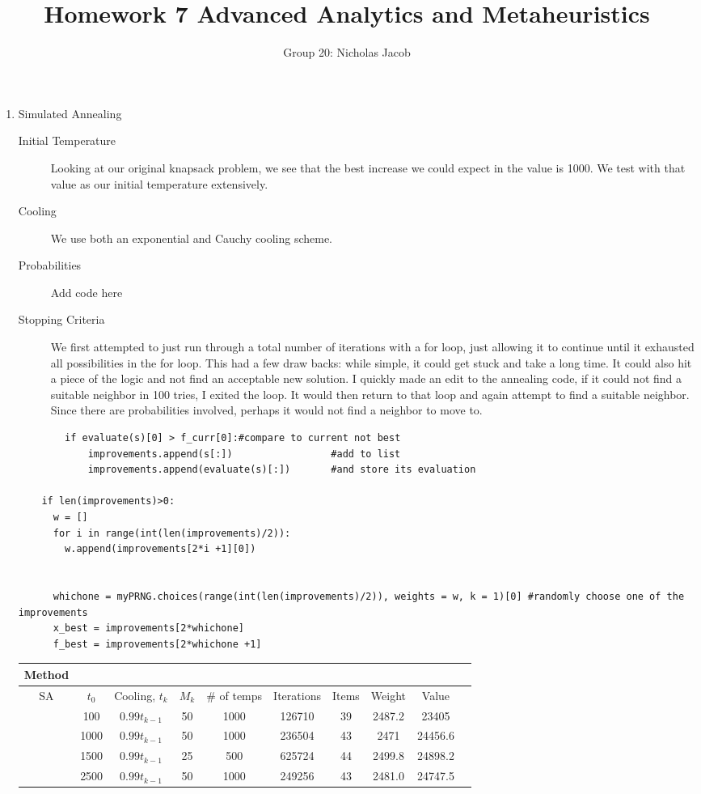 \documentclass[11pt]{article}
\author{Group 20: Nicholas Jacob}
\title{Homework 7 Advanced Analytics and Metaheuristics}
\begin{document}
\maketitle

\begin{enumerate}
\item Simulated Annealing

\begin{description}
\item[Initial Temperature]  Looking at our original knapsack problem, we see that the best increase we could expect in the value is 1000.  We test with that value as our initial temperature extensively.
\item[Cooling]  We use both an exponential and Cauchy cooling scheme. 
\item[Probabilities] Add code here
\item[Stopping Criteria]  We first attempted to just run through a total number of iterations with a for loop, just allowing it to continue until it exhausted all possibilities in the for loop.  This had a few draw backs:  while simple, it could get stuck and take a long time.  It could also hit a piece of the logic and not find an acceptable new solution.  I quickly made an edit to the annealing code, if it could not find a suitable neighbor in 100 tries, I exited the loop.  It would then return to that loop and again attempt to find a suitable neighbor.  Since there are probabilities involved, perhaps it would not find a neighbor to move to. 


\end{description}
\begin{verbatim}
        if evaluate(s)[0] > f_curr[0]:#compare to current not best
            improvements.append(s[:])                 #add to list
            improvements.append(evaluate(s)[:])       #and store its evaluation

    if len(improvements)>0:
      w = []
      for i in range(int(len(improvements)/2)):
        w.append(improvements[2*i +1][0])


      whichone = myPRNG.choices(range(int(len(improvements)/2)), weights = w, k = 1)[0] #randomly choose one of the improvements
      x_best = improvements[2*whichone]
      f_best = improvements[2*whichone +1]
\end{verbatim}
\begin{tabular}{c*{9}{c}}
Method\\ \hline
SA&$t_0$&Cooling, $t_k$&$M_k$& \# of temps&Iterations&Items&Weight&Value\\ \hline
&100&$0.99t_{k-1}$&50&1000&126710&39&2487.2&23405\\
&1000&$0.99t_{k-1}$&50&1000&236504&43&2471&24456.6\\
&1500&$0.99t_{k-1}$&25&500&625724&44&2499.8&24898.2\\
&2500&$0.99t_{k-1}$&50&1000&249256&43&2481.0&24747.5\\


\hline
\end{tabular}

\end{enumerate}
\end{document}

